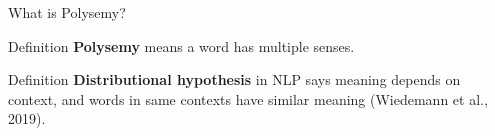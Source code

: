 % 
% 
%     
% 
%     
%     
% 
% 
%     
% 
% 





\begin{frame}{What is Polysemy?}
    
    \begin{definitionBlock}{Definition}
    \alert{\textbf{Polysemy}} means a word has multiple senses. 
    \end{definitionBlock}
    
    
    \begin{definitionBlock}{Definition}
    \alert{\textbf{Distributional hypothesis}} in NLP says meaning depends on context, and words in same contexts have similar meaning (Wiedemann et al., 2019). 
    \end{definitionBlock}
\end{frame}





